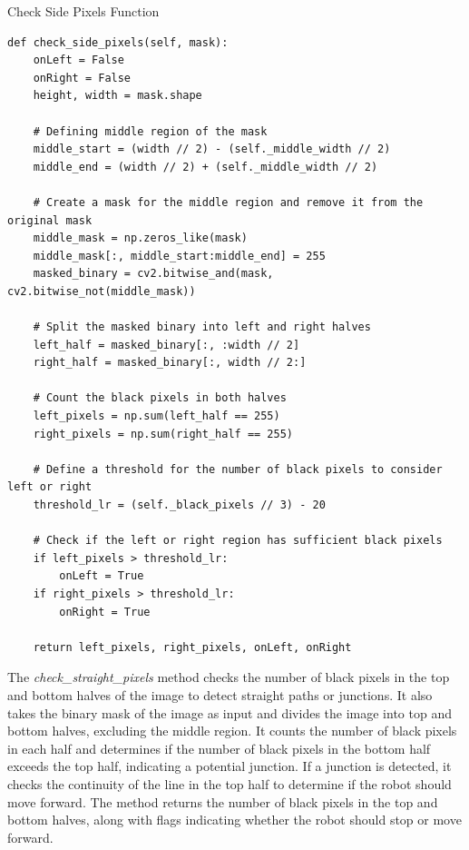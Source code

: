 \documentclass[../../main]{subfiles}
\begin{document}
\begin{codebox}[]{Check Side Pixels Function}
\begin{verbatim}
def check_side_pixels(self, mask):
    onLeft = False
    onRight = False
    height, width = mask.shape

    # Defining middle region of the mask
    middle_start = (width // 2) - (self._middle_width // 2)
    middle_end = (width // 2) + (self._middle_width // 2)
    
    # Create a mask for the middle region and remove it from the original mask
    middle_mask = np.zeros_like(mask)
    middle_mask[:, middle_start:middle_end] = 255 
    masked_binary = cv2.bitwise_and(mask, cv2.bitwise_not(middle_mask))

    # Split the masked binary into left and right halves
    left_half = masked_binary[:, :width // 2]
    right_half = masked_binary[:, width // 2:]

    # Count the black pixels in both halves
    left_pixels = np.sum(left_half == 255)
    right_pixels = np.sum(right_half == 255)
    
    # Define a threshold for the number of black pixels to consider left or right
    threshold_lr = (self._black_pixels // 3) - 20
    
    # Check if the left or right region has sufficient black pixels
    if left_pixels > threshold_lr:
        onLeft = True
    if right_pixels > threshold_lr:
        onRight = True
    
    return left_pixels, right_pixels, onLeft, onRight

\end{verbatim}
\end{codebox}

The \emph{check\_straight\_pixels} method checks the number of black
pixels in the top and bottom halves of the image to detect straight
paths or junctions. It also takes the binary mask of the image as input
and divides the image into top and bottom halves, excluding the middle
region. It counts the number of black pixels in each half and determines
if the number of black pixels in the bottom half exceeds the top half,
indicating a potential junction. If a junction is detected, it checks
the continuity of the line in the top half to determine if the robot
should move forward. The method returns the number of black pixels in
the top and bottom halves, along with flags indicating whether the robot
should stop or move forward.
\end{document}
